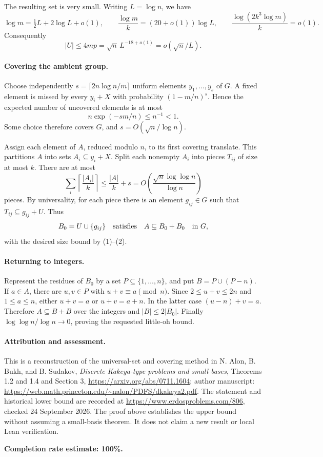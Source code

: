 The resulting set is very small. Writing \(L=\log n\), we have
\[
 \log m=\tfrac12L+2\log L+o(1),\qquad
 \frac{\log m}{k}=(20+o(1))\log L,
 \qquad
 \frac{\log(2k^3\log m)}{k}=o(1).
\]
Consequently
\[
 |U|\leq4mp=\sqrt n\,L^{-18+o(1)}
 =o(\sqrt n/L).
\tag{1}
\]

\paragraph{Covering the ambient group.}
Choose independently
\(s=\lceil2n\log n/m\rceil\) uniform elements \(y_1,\ldots,y_s\) of \(G\). A fixed element is missed by every \(y_i+X\) with probability \((1-m/n)^s\). Hence the expected number of uncovered elements is at most
\[
 n\exp(-sm/n)\leq n^{-1}<1.
\]
Some choice therefore covers \(G\), and \(s=O(\sqrt n/\log n)\).

Assign each element of \(A\), reduced modulo \(n\), to its first covering translate. This partitions \(A\) into sets \(A_i\subseteq y_i+X\). Split each nonempty \(A_i\) into pieces \(T_{ij}\) of size at most \(k\). There are at most
\[
 \sum_i\left\lceil\frac{|A_i|}{k}\right\rceil
 \leq\frac{|A|}{k}+s
 =O\!\left(\frac{\sqrt n\log\log n}{\log n}\right)
\tag{2}
\]
pieces. By universality, for each piece there is an element \(g_{ij}\in G\) such that \(T_{ij}\subseteq g_{ij}+U\). Thus
\[
 B_0=U\cup\{g_{ij}\}
 \quad\hbox{satisfies}\quad A\subseteq B_0+B_0\quad\text{in }G,
\]
with the desired size bound by (1)--(2).

\paragraph{Returning to integers.}
Represent the residues of \(B_0\) by a set \(P\subseteq\{1,\ldots,n\}\), and put \(B=P\cup(P-n)\). If \(a\in A\), there are \(u,v\in P\) with \(u+v\equiv a\pmod n\). Since \(2\leq u+v\leq2n\) and \(1\leq a\leq n\), either \(u+v=a\) or \(u+v=a+n\). In the latter case \((u-n)+v=a\). Therefore \(A\subseteq B+B\) over the integers and \(|B|\leq2|B_0|\). Finally \(\log\log n/\log n\to0\), proving the requested little-oh bound.

\paragraph{Attribution and assessment.}
This is a reconstruction of the universal-set and covering method in N. Alon, B. Bukh, and B. Sudakov, \emph{Discrete Kakeya-type problems and small bases}, Theorems 1.2 and 1.4 and Section 3, \url{https://arxiv.org/abs/0711.1604}; author manuscript: \url{https://web.math.princeton.edu/~nalon/PDFS/dkakeya2.pdf}. The statement and historical lower bound are recorded at \url{https://www.erdosproblems.com/806}, checked 24 September 2026. The proof above establishes the upper bound without assuming a small-basis theorem. It does not claim a new result or local Lean verification.

\textbf{Completion rate estimate: 100\%.}
